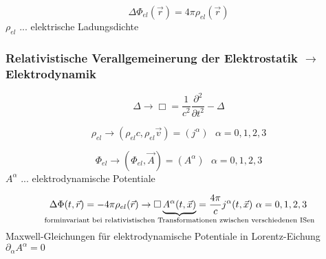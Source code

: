 \documentclass[a4paper, 11pt]{article}
\numberwithin{equation}{section}
\begin{document}
\begin{equation}
\label{glg:0 FeldgleichungElektrischesFeld}
\Delta \Phi_{el}(\vec{r}) = 4 \pi \rho_{el}(\vec{r})
\end{equation}
$\rho_{el}$ ... elektrische Ladungsdichte


\subsubsection*{Relativistische Verallgemeinerung der Elektrostatik $\rightarrow$ Elektrodynamik} 
\begin{equation}
\label{glg:0_verallLaplace}
\Delta \rightarrow \Box = \dfrac{1}{c^2} \dfrac{\partial^2}{\partial t^2} - \Delta
\end{equation}

\begin{equation}
\label{glg:0_verallLadungsdichte}
\rho_{el} \rightarrow (\rho_{el}c, \rho_{el}\vec{v}) = (j^\alpha) \text{      } \alpha = 0,1,2,3
\end{equation}

\begin{equation}
\label{glg:0_verallElektrischesFeld}
\Phi_{el} \rightarrow (\Phi_{el}, \vec{A}) = (A^\alpha) \text{      } \alpha = 0,1,2,3
\end{equation}
$A^\alpha$ ... elektrodynamische Potentiale

\begin{equation}
\label{glg:0_verallElektrischeFeldgleichung}
\Delta \Phi(t, \vec{r}) = - 4 \pi \rho_{el}(\vec{r}) \rightarrow \Box \underbrace{A^\alpha(t, \vec{x})}_{\mathclap{\text{forminvariant bei relativistischen Transformationen zwischen verschiedenen ISen}}} = \dfrac{4 \pi}{c} j^\alpha(t, \vec{x}) \text{      } \alpha = 0,1,2,3
\end{equation}
Maxwell-Gleichungen für elektrodynamische Potentiale in Lorentz-Eichung $\partial_\alpha A^\alpha = 0$
\end{document}
